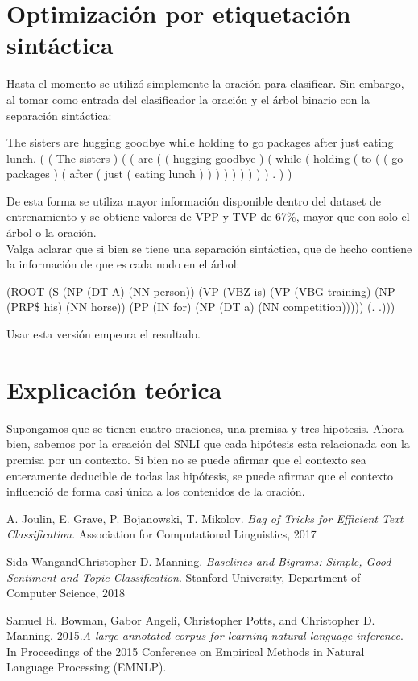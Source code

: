 \documentclass{article}
\begin{document}
	\section*{Optimización por etiquetación sintáctica}
	Hasta el momento se utilizó simplemente la oración para clasificar. Sin embargo, al tomar como entrada del clasificador la oración y el árbol binario con la separación sintáctica:
	\begin{spverbatim}
		The sisters are hugging goodbye while holding to go packages after just eating lunch. ( ( The sisters ) ( ( are ( ( hugging goodbye ) ( while ( holding ( to ( ( go packages ) ( after ( just ( eating lunch ) ) ) ) ) ) ) ) ) . ) )
	\end{spverbatim}
	\medskip
	De esta forma se utiliza mayor información disponible dentro del dataset de entrenamiento y se obtiene valores de VPP y TVP de 67\%, mayor que con solo el árbol o la oración.\\
	Valga aclarar que si bien se tiene una separación sintáctica, que de hecho contiene la información de que es cada nodo en el árbol:
	\begin{spverbatim}
		(ROOT (S (NP (DT A) (NN person)) (VP (VBZ is) (VP (VBG training) (NP (PRP\$ his) (NN horse)) (PP (IN for) (NP (DT a) (NN competition))))) (. .)))
	\end{spverbatim}
	\medskip
	Usar esta versión empeora el resultado.
	
	\section*{Explicación teórica}
	Supongamos que se tienen cuatro oraciones, una premisa y tres hipotesis. Ahora bien, sabemos por la creación del SNLI\cite{snli} que cada hipótesis esta relacionada con la premisa por un contexto. Si bien no se puede afirmar que el contexto sea enteramente deducible de todas las hipótesis, se puede afirmar que el contexto influenció de forma casi única a los contenidos de la oración.
	
	\newpage
	\begin{thebibliography}{9}
		A. Joulin, E. Grave, P. Bojanowski, T. Mikolov. \textit{Bag of Tricks for Efficient Text Classification}. Association for Computational Linguistics, 2017
		
		Sida WangandChristopher D. Manning. \textit{Baselines and Bigrams: Simple, Good Sentiment and Topic Classification}. Stanford University, Department of Computer Science, 2018
		
		Samuel R. Bowman, Gabor Angeli, Christopher Potts, and Christopher D. Manning. 2015.\textit{A large annotated corpus for learning natural language inference}. In Proceedings of the 2015 Conference on Empirical Methods in Natural Language Processing (EMNLP). 
	\end{thebibliography}
\end{document}
